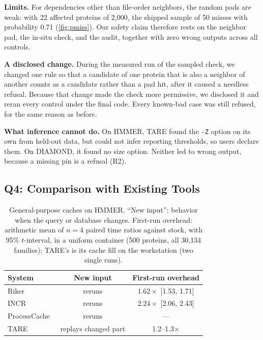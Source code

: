 \documentclass[letterpaper,twocolumn,10pt]{article}
\theoremstyle{definition}
\newcommand{\sys}{TARE\xspace}
\begin{document}
\textbf{Limits.} For dependencies other than file-order neighbors, the random pads are weak: with 22 affected proteins of
2{,}000, the shipped sample of 50 misses with probability 0.71 (\cref{fig:pmiss}). Our safety claim therefore rests on the
neighbor pad, the in-situ check, and the audit, together with zero wrong outputs across all controls.

\textbf{A disclosed change.} During the measured run of the sampled check, we changed one rule so that a candidate of one
protein that is also a neighbor of another counts as a candidate rather than a pad hit, after it caused a needless
refusal. Because that change made the check more permissive, we disclosed it and reran every control under the final code.
Every known-bad case was still refused, for the same reason as before.

\textbf{What inference cannot do.} On HMMER, \sys found the \texttt{-Z} option on its own from held-out data, but could not
infer reporting thresholds, so users declare them. On DIAMOND, it found no size option. Neither led to wrong output, because
a missing pin is a refusal (R2).

\subsection{Q4: Comparison with Existing Tools}
\label{sec:eval-baselines}

\begin{table}[t]
\caption{General-purpose caches on HMMER. ``New input'': behavior when the query or database changes. First-run overhead: arithmetic mean of $n=4$ paired time ratios against stock, with 95\% $t$-interval, in a uniform container
(500 proteins, all 30{,}134 families); \sys's is its cache fill on the workstation (two single runs).}
\label{tab:baselines}
\centering\small
\begin{tabular}{@{}lcc@{}}
\toprule
System & New input & First-run overhead \\
\midrule
Riker~\cite{curtsinger2022riker}               & reruns & $1.62\times$ [1.53, 1.71] \\
INCR~\cite{xie2026incr}                        & reruns & $2.24\times$ [2.06, 2.43] \\
ProcessCache~\cite{shiptoski2023processcache}  & reruns & --- \\
\sys                                           & replays changed part & 1.2--1.3$\times$ \\
\bottomrule
\end{tabular}
\end{table}
\end{document}
